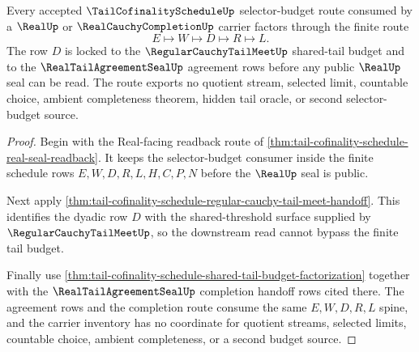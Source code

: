 \begin{theorem}
\label{thm:tail-cofinality-schedule-selector-budget-lock}
Every accepted $\TailCofinalityScheduleUp$ selector-budget route consumed by a $\RealUp$ or $\RealCauchyCompletionUp$ carrier factors through the finite route
$$
E \longmapsto W \longmapsto D \longmapsto R \longmapsto L.
$$
The row $D$ is locked to the $\RegularCauchyTailMeetUp$ shared-tail budget and to the $\RealTailAgreementSealUp$ agreement rows before any public $\RealUp$ seal can be read. The route exports no quotient stream, selected limit, countable choice, ambient completeness theorem, hidden tail oracle, or second selector-budget source.
\end{theorem}
\begin{proof}
Begin with the Real-facing readback route of \autoref{thm:tail-cofinality-schedule-real-seal-readback}. It keeps the selector-budget consumer inside the finite schedule rows $E,W,D,R,L,H,C,P,N$ before the $\RealUp$ seal is public.

Next apply \autoref{thm:tail-cofinality-schedule-regular-cauchy-tail-meet-handoff}. This identifies the dyadic row $D$ with the shared-threshold surface supplied by $\RegularCauchyTailMeetUp$, so the downstream read cannot bypass the finite tail budget.

Finally use \autoref{thm:tail-cofinality-schedule-shared-tail-budget-factorization} together with the $\RealTailAgreementSealUp$ completion handoff rows cited there. The agreement rows and the completion route consume the same $E,W,D,R,L$ spine, and the carrier inventory has no coordinate for quotient streams, selected limits, countable choice, ambient completeness, or a second budget source.
\end{proof}

